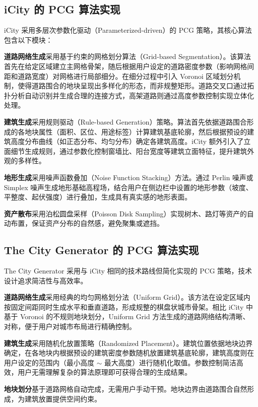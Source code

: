\documentclass[UTF8,a4paper,10pt]{ctexart}
\begin{document}
\subsection{iCity 的 PCG 算法实现}

iCity 采用多层次参数化驱动（Parameterized-driven）的 PCG 策略，其核心算法包含以下模块：

\textbf{道路网络生成}采用基于约束的网格划分算法（Grid-based Segmentation）。该算法首先在给定区域建立主网格骨架，随后根据用户设定的道路密度参数（影响网格间距和道路宽度）对网格进行局部细分。在细分过程中引入 Voronoi 区域划分机制，使得道路围合的地块呈现出多样化的形态，而非规整矩形。道路交叉口通过拓扑分析自动识别并生成合理的连接方式，高架道路则通过高度参数控制实现立体化处理。

\textbf{建筑生成}采用规则驱动（Rule-based Generation）策略。算法首先依据道路围合形成的各地块属性（面积、区位、用途标签）计算建筑基底轮廓，然后根据预设的建筑高度分布曲线（如正态分布、均匀分布）确定各建筑高度。iCity 额外引入了立面细节生成规则，通过参数化控制窗墙比、阳台宽度等建筑立面特征，提升建筑外观的多样性。

\textbf{地形生成}采用噪声函数叠加（Noise Function Stacking）方法。通过 Perlin 噪声或 Simplex 噪声生成地形基础高程场，结合用户在侧边栏中设置的地形参数（坡度、平整度、起伏强度）进行叠加，生成具有真实感的地形表面。

\textbf{资产散布}采用泊松圆盘采样（Poisson Disk Sampling）实现树木、路灯等资产的自动布置，保证资产分布的自然感，避免聚集或遮挡。

\subsection{The City Generator 的 PCG 算法实现}

The City Generator 采用与 iCity 相同的技术路线但简化实现的 PCG 策略，技术设计追求简洁性与高效率。

\textbf{道路网络生成}采用经典的均匀网格划分法（Uniform Grid）。该方法在设定区域内按固定间距同时生成水平和垂直道路，形成规整的棋盘状城市骨架。相比 iCity 中基于 Voronoi 的不规则地块划分，Uniform Grid 方法生成的道路网络结构清晰、对称，便于用户对城市布局进行精确控制。

\textbf{建筑生成}采用随机化放置策略（Randomized Placement）。建筑位置依据地块边界确定，在各地块内根据预设的建筑密度参数随机放置建筑基底轮廓，建筑高度则在用户设定的范围内（最小高度 $\sim$ 最大高度）进行随机化取值。参数控制简洁高效，用户无需理解复杂的算法原理即可获得合理的生成结果。

\textbf{地块划分}基于道路网格自动完成，无需用户手动干预。地块边界由道路围合自然形成，为建筑放置提供空间约束。
\end{document}
